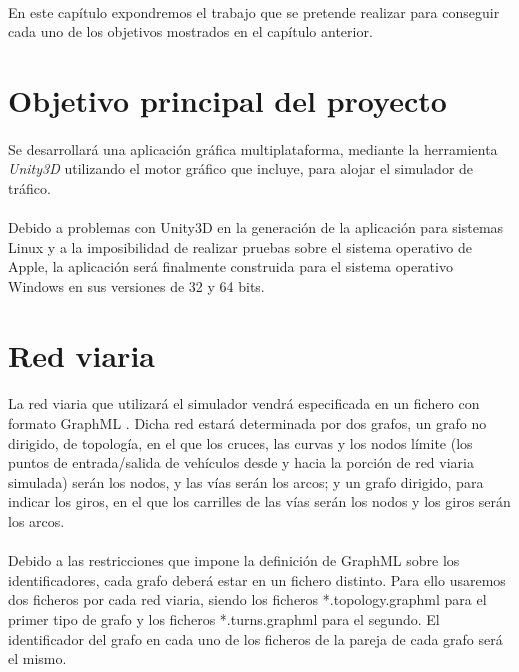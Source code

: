 	\paragraph{}
	En este capítulo expondremos el trabajo que se pretende realizar para conseguir cada uno de los objetivos mostrados en el capítulo anterior.
	
\section{Objetivo principal del proyecto}

	\paragraph{}
	Se desarrollará una aplicación gráfica multiplataforma, mediante la herramienta \emph{Unity3D} utilizando el motor gráfico que incluye, para alojar el simulador de tráfico.
	
	\paragraph{}
	Debido a problemas con Unity3D en la generación de la aplicación para sistemas Linux y a la imposibilidad de realizar pruebas sobre el sistema operativo de Apple, la aplicación será finalmente construida para el sistema operativo Windows en sus versiones de 32 y 64 bits.

\section{Red viaria}
\label{section:RedViaria}
	\paragraph{}
	La red viaria que utilizará el simulador vendrá especificada en un fichero con formato GraphML \cite{GraphML_man}. Dicha red estará determinada por dos grafos, un grafo no dirigido, de topología, en el que los cruces, las curvas y los nodos límite (los puntos de entrada/salida de vehículos desde y hacia la porción de red viaria simulada) serán los nodos, y las vías serán los arcos; y un grafo dirigido, para indicar los giros, en el que los carrilles de las vías serán los nodos y los giros serán los arcos.
	
	\paragraph{}	
	Debido a las restricciones que impone la definición de GraphML sobre los identificadores, cada grafo deberá estar en un fichero distinto. Para ello usaremos dos ficheros por cada red viaria, siendo los ficheros *.topology.graphml para el primer tipo de grafo y los ficheros *.turns.graphml para el segundo. El identificador del grafo en cada uno de los ficheros de la pareja de cada grafo será el mismo.
	
